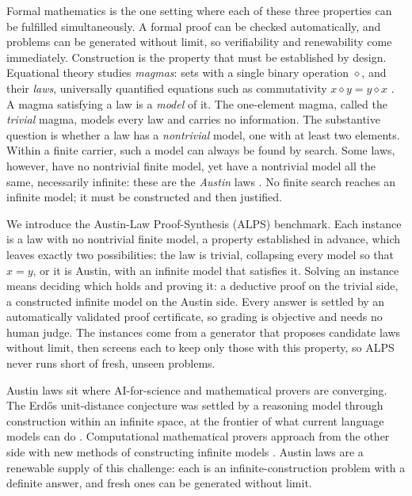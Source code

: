 \documentclass[letterpaper]{article} %
\newcommand{\op}{\diamond}
\begin{document}
Formal mathematics is the one setting where each of these three properties can be fulfilled simultaneously. A formal proof can be checked automatically, and problems can be generated without limit, so verifiability and renewability come immediately. Construction is the property that must be established by design. Equational theory \citep{birkhoff1935structure} studies \textit{magmas}: sets with a single binary operation $\op$, and their \textit{laws}, universally quantified equations such as commutativity $x \op y = y \op x$ \citep{burris1981course, baader1998term}. A magma satisfying a law is a \textit{model} of it. The one-element magma, called the \textit{trivial} magma, models every law and carries no information. The substantive question is whether a law has a \textit{nontrivial} model, one with at least two elements. Within a finite carrier, such a model can always be found by search. Some laws, however, have no nontrivial finite model, yet have a nontrivial model all the same, necessarily infinite: these are the \textit{Austin} laws \citep{kisielewicz1997austin, bolan2025equational}. No finite search reaches an infinite model; it must be constructed and then justified.

We introduce the Austin-Law Proof-Synthesis (ALPS) benchmark. Each instance is a law with no nontrivial finite model, a property established in advance, which leaves exactly two possibilities: the law is trivial, collapsing every model so that $x=y$, or it is Austin, with an infinite model that satisfies it. Solving an instance means deciding which holds and proving it: a deductive proof on the trivial side, a constructed infinite model on the Austin side. Every answer is settled by an automatically validated proof certificate, so grading is objective and needs no human judge. The instances come from a generator that proposes candidate laws without limit, then screens each to keep only those with this property, so ALPS never runs short of fresh, unseen problems.

Austin laws sit where AI-for-science and mathematical provers are converging. The Erdős unit-distance conjecture was settled by a reasoning model through construction within an infinite space, at the frontier of what current language models can do \citep{openai2026unitdistance}. Computational mathematical provers approach from the other side with new methods of constructing infinite models \citep{janota2026case}. Austin laws are a renewable supply of this challenge: each is an infinite-construction problem with a definite answer, and fresh ones can be generated without limit. 
\end{document}
